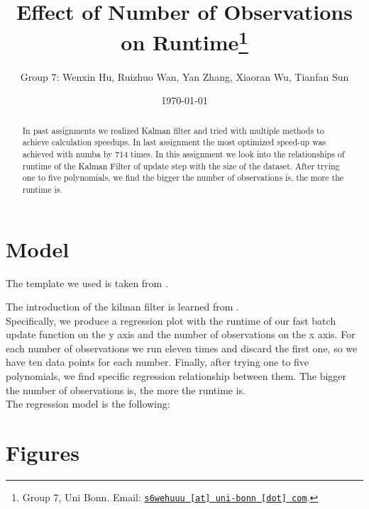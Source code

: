 \documentclass[11pt, a4paper, leqno]{article}
\begin{document}
\title{Effect of Number of Observations on Runtime\thanks{Group 7, Uni Bonn. Email: \href{mailto:s6wehuuu@uni-bonn.com}{\nolinkurl{s6wehuuu [at] uni-bonn [dot] com}}.}}

\author{Group 7: Wenxin Hu, Ruizhuo Wan, Yan Zhang, Xiaoran Wu, Tianfan Sun}

\date{
\today
}

\maketitle


\begin{abstract}

     In past assignments we realized Kalman filter and tried with multiple methods to achieve calculation speedups. In last assignment the most optimized speed-up was achieved with numba by 714 times. In this assignment we look into the relationships of runtime of the Kalman Filter of update step with the size of the dataset. After trying one to five polynomials, we find the bigger the number of observations is, the more the runtime is.
   

\end{abstract}
\clearpage

\section{Model} %
\label{sec:Model}

The template we used is taken from \citet{GaudeckerEconProjectTemplates}.

The introduction of the kilman filter is learned from \citet{Gabler18}. \\



Specifically, we produce a regression plot with the runtime of our fast batch update function on the y axis and the number of observations on the x axis. For each number of observations we run eleven times and discard the first one, so we have ten data points for each number. Finally, after trying one to five polynomials, we find specific regression relationship between them. The bigger the number of observations is, the more the runtime is.\\

   

The regression model is the following:


\clearpage


\section{Figures} %
\label{sec:Figures}
\end{document}
